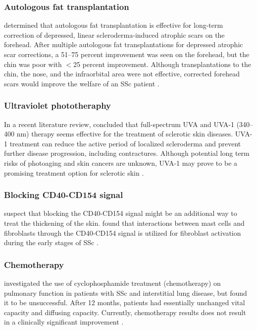 \subsubsection{Autologous fat transplantation}

\citeauthor{roh} determined that autologous fat transplantation is effective
for long-term correction of depressed, linear scleroderma-induced atrophic
scars on the forehead. After multiple autologous fat transplantations for
depressed atrophic scar corrections, a 51--75 percent improvement was seen on
the forehead, but the chin was poor with $<$25 percent improvement. Although
transplantations to the chin, the nose, and the infraorbital area were not
effective, corrected forehead scars would improve the welfare of an SSc
patient \citep{roh}. 

\subsubsection{Ultraviolet phototheraphy}

In a recent literature review, \citeauthor{kroft} concluded that full-spectrum
UVA and UVA-1 (340--400 nm) therapy seems effective for the treatment of
sclerotic skin diseases. UVA-1 treatment can reduce the active period of
localized scleroderma and prevent further disease progression, including
contractures. Although potential long term risks of photoaging and skin
cancers are unknown, UVA-1 may prove to be a promising treatment option for
sclerotic skin \citep{kroft}.


\subsubsection{Blocking CD40-CD154 signal}

\citeauthor{kawai} suspect that blocking the CD40-CD154 signal might be an
additional way to treat the thickening of the skin. \citeauthor{kawai} found
that interactions between mast cells and fibroblasts through the CD40-CD154
signal is utilized for fibroblast activation during the early stages of SSc
\citep{kawai}.

\subsubsection{Chemotherapy}

\citeauthor{nannini} investigated the use of cyclophosphamide treatment
(chemotherapy) on pulmonary function in patients with SSc and interstitial
lung disease, but found it to be unsuccessful. After 12 months, patients had
essentially unchanged vital capacity and diffusing capacity. Currently,
chemotherapy results does not result in a clinically significant improvement
\citep{nannini}.

